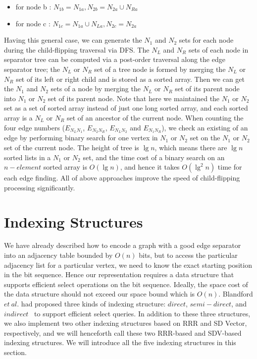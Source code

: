 \documentclass[12pt,glossary]{dalthesis}
\begin{document}
\begin{itemize}[noitemsep]
\item for node b : $ N_{1b} = N_{1a}, N_{2b} = N_{2a} \cup N_{Ra}$
\item for node c : $ N_{1c} = N_{1a} \cup N_{La}, N_{2c} = N_{2a}$ 
\end{itemize}

Having this general case,  we can generate the $N_{1}$ and $N_{2}$ sets for each node during the child-flipping traversal via DFS. The $N_{L}$ and $N_{R}$ sets of each node in separator tree can be computed via a post-order traversal along the edge separator tree; the $N_{L}$ or $N_{R}$ set of a tree node is formed by merging the $N_{L}$ or $N_{R}$ set of its left or right child and is stored as a sorted array. Then we can get the $N_{1}$ and $N_{2}$ sets of a node by merging the $N_{L}$ or $N_{R}$ set of its parent node into $N_{1}$ or $N_{2}$ set of its parent node. Note that here we maintained the $N_{1}$ or $N_{2}$ set as a set of sorted array instead of just one long sorted array, and each sorted array is a $N_{L}$ or $N_{R}$ set of an ancestor of the current node. When counting the four edge numbers ($E_{N_{L}N_{1}}$, $E_{N_{2}N_{R}}$, $E_{N_{L}N_{2}}$ and $E_{N_{1}N_{R}}$), we check an existing of an edge by performing binary search for one vertex in $N_{1}$ or $N_{2}$ set on the $N_{1}$ or $N_{2}$ set of the current node. The height of tree is $\lg n$, which means there are $\lg n$ sorted lists in a $N_{1}$ or $N_{2}$ set, and the time cost of a binary search on an $n-element$ sorted array is $O(\lg n)$, and hence it takes $O(\lg ^{2} n)$ time for each edge finding. All of above approaches improve the speed of child-flipping processing significantly.

\section{Indexing Structures}

We have already described how to encode a graph with a good edge separator into an adjacency table bounded by $O(n)$ bits, but to access the particular adjacency list for a particular vertex, we need to know the exact starting position in the bit sequence. Hence our representation requires a data structure that supports efficient select operations on the bit sequence. Ideally, the space cost of the data structure should not exceed our space bound which is $O(n)$. Blandford $et \ al.$ had proposed three kinds of indexing structure: $direct$, $semi-direct$, and $indirect$~\cite{compact-representation} to support efficient select queries. In addition to these three structures, we also implement two other indexing structures based on RRR and SD Vector, respectively, and we will henceforth call these two RRR-based and SDV-based indexing structures. We will introduce all the five indexing structures in this section.
\end{document}
